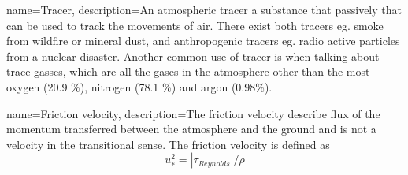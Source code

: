 {
    name=Tracer,
    description={An atmospheric tracer a substance that passively that can be used to track the movements of air. There exist both tracers eg. smoke from wildfire or mineral dust, and anthropogenic tracers eg. radio active particles from a nuclear disaster. Another common use of tracer is when talking about trace gasses, which are all the gases in the atmosphere other than the most oxygen (20.9 \%), nitrogen (78.1 \%) and argon (0.98\%). }
}

{
    name=Friction velocity,
    description={The friction velocity describe flux of the momentum transferred between the atmosphere and the ground and is not a velocity in the transitional sense. The friction velocity is defined as 
    \begin{equation}
        u^2_* = \left|\tau_{Reynolds}\right|/\rho
    \end{equation}
    }
}